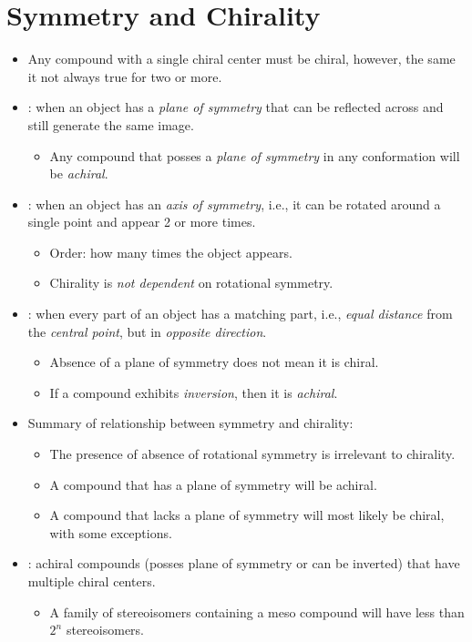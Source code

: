 \documentclass{inVerba-notes}
\begin{document}
\section{Symmetry and Chirality}
\begin{itemize}
    \item Any compound with a single chiral center must be chiral, however, the same it not always true for two or more.
    \item {}: when an object has a \emph{plane of symmetry} that can be reflected across and still generate the same image.
        \begin{itemize}
            \item Any compound that posses a \emph{plane of symmetry} in any conformation will be \emph{achiral}.
        \end{itemize}
    \item {}: when an object has an \emph{axis of symmetry}, i.e., it can be rotated around a single point and appear 2 or more times.
        \begin{itemize}
            \item Order: how many times the object appears.
            \item Chirality is \emph{not dependent} on rotational symmetry.
        \end{itemize}
    \item {}: when every part of an object has a matching part, i.e., \emph{equal distance} from the \emph{central point}, but in \emph{opposite direction}.
        \begin{itemize}
            \item Absence of a plane of symmetry does not mean it is chiral.
            \item If a compound exhibits \emph{inversion}, then it is \emph{achiral}.
        \end{itemize}
    \item Summary of relationship between symmetry and chirality:
        \begin{itemize}
            \item The presence of absence of rotational symmetry is irrelevant to chirality.
            \item A compound that has a plane of symmetry will be achiral.
            \item A compound that lacks a plane of symmetry will most likely be chiral, with some exceptions.
        \end{itemize}
    \item {}: achiral compounds (posses plane of symmetry or can be inverted) that have multiple chiral centers.
        \begin{itemize}
            \item A family of stereoisomers containing a meso compound will have less than \(2^n\) stereoisomers.
        \end{itemize}

\end{itemize}
\end{document}
